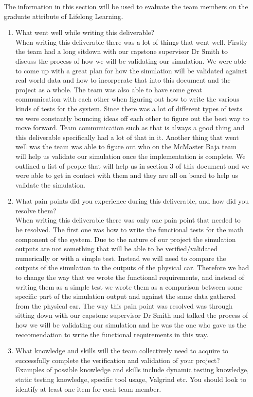 \documentclass[12pt, titlepage]{article}
\begin{document}
The information in this section will be used to evaluate the team members on the
graduate attribute of Lifelong Learning.



\begin{enumerate}
  \item What went well while writing this deliverable?\\ 
  When writing this deliverable there was a lot of things that went well.
  Firstly the team had a long sitdown with our capstone supervisor Dr Smith to discuss the process of how we will be validating our simulation.
  We were able to come up with a great plan for how the simulation will be validated against real world data and how to incorperate that into this document and the project as a whole.
  The team was also able to have some great communication with each other when figuring out how to write the various kinds of tests for the system.
  Since there was a lot of different types of tests we were constantly bouncing ideas off each other to figure out the best way to move forward.
  Team communication such as that is always a good thing and this deliverable specifically had a lot of that in it.
  Another thing that went well was the team was able to figure out who on the McMaster Baja team will help us validate our simulation once the implementation is complete.
  We outlined a list of people that will help us in section 3 of this document and we were able to get in contact with them and they are all on board to help us validate the simulation.  

  \item What pain points did you experience during this deliverable, and how
    did you resolve them?\\
    When writing this deliverable there was only one pain point that needed to be resolved.
    The first one was how to write the functional tests for the math component of the system.
    Due to the nature of our project the simulation outputs are not something that will be able to be verified/validated numerically or with a simple test.
    Instead we will need to compare the outputs of the simulation to the outputs of the physical car.
    Therefore we had to change the way that we wrote the functional requirements, and instead of writing them as a simple test we wrote them as a comparison between some specific part of the simulation output and against the same data gathered from the physical car.
    The way this pain point was resolved was through sitting down with our capstone supervisor Dr Smith and talked the process of how we will be validating our simulation and he was the one who gave us the reccomendation to write the functional requirements in this way.
  \item What knowledge and skills will the team collectively need to acquire to
  successfully complete the verification and validation of your project?
  Examples of possible knowledge and skills include dynamic testing knowledge,
  static testing knowledge, specific tool usage, Valgrind etc.  You should look to
  identify at least one item for each team member.


\end{enumerate}
\end{document}
